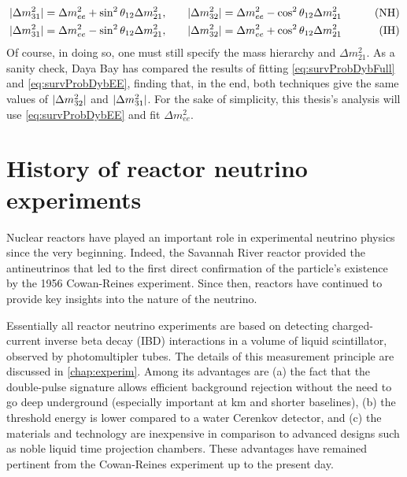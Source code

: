 \documentclass[../thesis.tex]{subfiles}
\begin{document}
\begin{align*}
  \lvert \Delta m^2_{31}\rvert = \Delta m^2_{ee} + \sin^2 \theta_{12} \Delta m^2_{21}, \qquad
  & \lvert \Delta m^2_{32}\rvert = \Delta m^2_{ee} - \cos^2 \theta_{12} \Delta m^2_{21} \qquad
  & \text{(NH)}\\
  \lvert \Delta m^2_{31}\rvert = \Delta m^2_{ee} - \sin^2 \theta_{12} \Delta m^2_{21}, \qquad
  & \lvert \Delta m^2_{32}\rvert = \Delta m^2_{ee} + \cos^2 \theta_{12} \Delta m^2_{21} \qquad
  & \text{(IH)}
\end{align*}
Of course, in doing so, one must still specify the mass hierarchy and \(\Delta m^2_{21}.\) As a sanity check, Daya Bay has compared the results of fitting \eqref{eq:survProbDybFull} and \eqref{eq:survProbDybEE}, finding that, in the end, both techniques give the same values of \(\lvert \Delta m^2_{32}\rvert\) and \(\lvert \Delta m^2_{31}\rvert\). For the sake of simplicity, this thesis's analysis will use \eqref{eq:survProbDybEE} and fit \(\Delta m^2_{ee}\).

\section{History of reactor neutrino experiments}
\label{sec:introReactor}

Nuclear reactors have played an important role in experimental neutrino physics since the very beginning. Indeed, the Savannah River reactor provided the antineutrinos that led to the first direct confirmation of the particle's existence by the 1956 Cowan-Reines experiment. Since then, reactors have continued to provide key insights into the nature of the neutrino.

Essentially all reactor neutrino experiments are based on detecting charged-current inverse beta decay (IBD) interactions in a volume of liquid scintillator, observed by photomultipler tubes. The details of this measurement principle are discussed in \autoref{chap:experim}. Among its advantages are (a) the fact that the double-pulse signature allows efficient background rejection without the need to go deep underground (especially important at km and shorter baselines), (b) the threshold energy is lower compared to a water Cerenkov detector, and (c) the materials and technology are inexpensive in comparison to advanced designs such as noble liquid time projection chambers. These advantages have remained pertinent from the Cowan-Reines experiment up to the present day.
\end{document}
